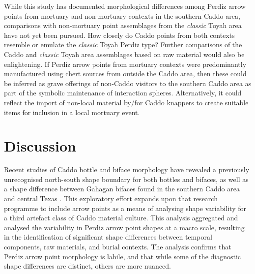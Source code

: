\documentclass[review]{elsarticle}
\begin{document}
While this study has documented morphological differences among Perdiz arrow points from mortuary and non-mortuary contexts in the southern Caddo area, comparisons with non-mortuary point assemblages from the \textit{classic} Toyah area have not yet been pursued. How closely do Caddo points from both contexts resemble or emulate the \textit{classic} Toyah Perdiz type? Further comparisons of the Caddo and \textit{classic} Toyah area assemblages based on raw material would also be enlightening. If Perdiz arrow points from mortuary contexts were predominantly manufactured using chert sources from outside the Caddo area, then these could be inferred as grave offerings of non-Caddo visitors to the southern Caddo area as part of the symbolic maintenance of interaction spheres. Alternatively, it could reflect the import of non-local material by/for Caddo knappers to create suitable items for inclusion in a local mortuary event.

\section*{Discussion}

Recent studies of Caddo bottle and biface morphology have revealed a previously unrecognised north-south shape boundary for both bottles and bifaces, as well as a shape difference between Gahagan bifaces found in the southern Caddo area and central Texas \citep{RN7162,RN5693,RN8074,RN7927,RN8158,RN8370,RN8322,RN8312}. This exploratory effort expands upon that research programme to include arrow points as a means of analysing shape variability for a third artefact class of Caddo material culture. This analysis aggregated and analysed the variability in Perdiz arrow point shapes at a macro scale, resulting in the identification of significant shape differences between temporal components, raw materials, and burial contexts. The analysis confirms that Perdiz arrow point morphology is labile, and that while some of the diagnostic shape differences are distinct, others are more nuanced.
\end{document}
